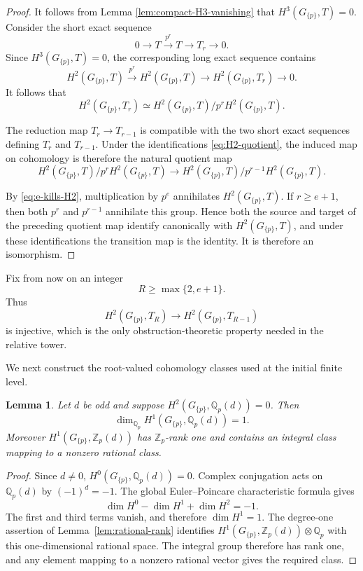 \documentclass[11pt]{amsart}
\numberwithin{equation}{section}
\newcommand{\Qp}{\mathbb Q_p}
\newcommand{\Zp}{\mathbb Z_p}
\newtheorem{lemma}[theorem]{Lemma}
\theoremstyle{definition}
\begin{document}
\begin{proof}
It follows from Lemma \ref{lem:compact-H3-vanishing} that $H^3(G_{\{p\}},T)=0$. Consider the short exact sequence
\[
        0\longrightarrow T
        \xrightarrow{p^r}
        T
        \longrightarrow T_r
        \longrightarrow0.
\]
Since $H^3(G_{\{p\}},T)=0$, the corresponding long exact sequence
contains
\[
 H^2(G_{\{p\}},T)
 \xrightarrow{p^r}
 H^2(G_{\{p\}},T)
 \longrightarrow
 H^2(G_{\{p\}},T_r)
 \longrightarrow0.
\]
It follows that
\begin{equation}\label{eq:H2-quotient}
 H^2(G_{\{p\}},T_r)
 \simeq
 H^2(G_{\{p\}},T)/
 p^rH^2(G_{\{p\}},T).
\end{equation}

The reduction map $T_r\to T_{r-1}$ is compatible with the two short
exact sequences defining $T_r$ and $T_{r-1}$. Under the
identifications \eqref{eq:H2-quotient}, the induced map on
cohomology is therefore the natural quotient map
\[
 H^2(G_{\{p\}},T)/
 p^rH^2(G_{\{p\}},T)
 \longrightarrow
 H^2(G_{\{p\}},T)/
 p^{r-1}H^2(G_{\{p\}},T).
\]

By \eqref{eq:e-kills-H2}, multiplication by $p^e$ annihilates
$H^2(G_{\{p\}},T)$. If $r\ge e+1$, then both $p^r$ and
$p^{r-1}$ annihilate this group. Hence both the source and target of
the preceding quotient map identify canonically with
$H^2(G_{\{p\}},T)$, and under these identifications the transition
map is the identity. It is therefore an isomorphism.
\end{proof}

Fix from now on an integer
\begin{equation}\label{eq:R-choice}
        R\ge\max\{2,e+1\}.
\end{equation}
Thus
\[
 H^2(G_{\{p\}},T_R)\longrightarrow H^2(G_{\{p\}},T_{R-1})
\]
is injective, which is the only obstruction-theoretic property needed
in the relative tower.

We next construct the root-valued cohomology classes used at the
initial finite level.

\begin{lemma}\label{lem:odd-H1}
Let $d$ be odd and suppose
$H^2(G_{\{p\}},\Qp(d))=0$. Then
\[
        \dim_{\Qp}H^1(G_{\{p\}},\Qp(d))=1.
\]
Moreover $H^1(G_{\{p\}},\Zp(d))$ has $\Zp$-rank one and contains an
integral class mapping to a nonzero rational class.
\end{lemma}

\begin{proof}
Since $d\neq0$,
$H^0(G_{\{p\}},\Qp(d))=0$.  Complex conjugation acts on
$\Qp(d)$ by $(-1)^d=-1$.  The global Euler--Poincare characteristic
formula gives
\[
 \dim H^0-\dim H^1+\dim H^2=-1.
\]
The first and third terms vanish, and therefore $\dim H^1=1$.
The degree-one assertion of Lemma~\ref{lem:rational-rank} identifies
$H^1(G_{\{p\}},\Zp(d))\otimes\Qp$ with this one-dimensional rational
space.  The integral group therefore has rank one, and any element
mapping to a nonzero rational vector gives the required class.
\end{proof}
\end{document}
